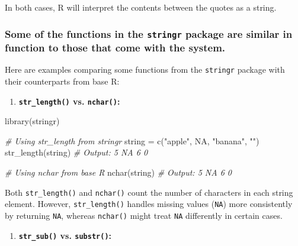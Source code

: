 \documentclass[
]{article}
\newenvironment{Shaded}{}{}
\newcommand{\CommentTok}[1]{\textcolor[rgb]{0.38,0.63,0.69}{\textit{#1}}}
\newcommand{\ConstantTok}[1]{\textcolor[rgb]{0.53,0.00,0.00}{#1}}
\newcommand{\FunctionTok}[1]{\textcolor[rgb]{0.02,0.16,0.49}{#1}}
\newcommand{\NormalTok}[1]{#1}
\newcommand{\OtherTok}[1]{\textcolor[rgb]{0.00,0.44,0.13}{#1}}
\newcommand{\StringTok}[1]{\textcolor[rgb]{0.25,0.44,0.63}{#1}}
\begin{document}
In both cases, R will interpret the contents between the quotes as a
string.

\hypertarget{some-of-the-functions-in-the-stringr-package-are-similar-in-function-to-those-that-come-with-the-system}{%
\subsubsection{\texorpdfstring{Some of the functions in the
\texttt{stringr} package are similar in function to those that come with
the
system.}{Some of the functions in the stringr package are similar in function to those that come with the system.}}\label{some-of-the-functions-in-the-stringr-package-are-similar-in-function-to-those-that-come-with-the-system}}

Here are examples comparing some functions from the \texttt{stringr}
package with their counterparts from base R:

\begin{enumerate}
\def\labelenumi{\arabic{enumi}.}
\item
  \textbf{\texttt{str\_length()} vs. \texttt{nchar()}:}
\end{enumerate}

\begin{Shaded}
\begin{Highlighting}[]
\FunctionTok{library}\NormalTok{(stringr)}

\CommentTok{\# Using str\_length from stringr}
\NormalTok{string }\OtherTok{=} \FunctionTok{c}\NormalTok{(}\StringTok{"apple"}\NormalTok{, }\ConstantTok{NA}\NormalTok{, }\StringTok{"banana"}\NormalTok{, }\StringTok{""}\NormalTok{)}
\FunctionTok{str\_length}\NormalTok{(string)}
\CommentTok{\# Output: 5   NA   6   0}

\CommentTok{\# Using nchar from base R}
\FunctionTok{nchar}\NormalTok{(string)}
\CommentTok{\# Output: 5  NA   6   0}
\end{Highlighting}
\end{Shaded}

Both \texttt{str\_length()} and \texttt{nchar()} count the number of
characters in each string element. However, \texttt{str\_length()}
handles missing values (\texttt{NA}) more consistently by returning
\texttt{NA}, whereas \texttt{nchar()} might treat \texttt{NA}
differently in certain cases.

\begin{enumerate}
\def\labelenumi{\arabic{enumi}.}
\item
  \textbf{\texttt{str\_sub()} vs. \texttt{substr()}:}
\end{enumerate}
\end{document}
